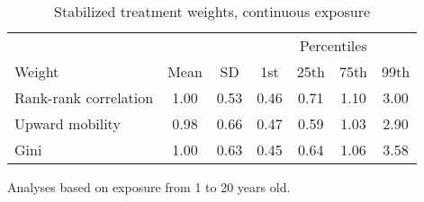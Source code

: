 \begin{table}[htp]
\centering
\footnotesize
\setlength{\tabcolsep}{10pt}
\renewcommand{\arraystretch}{1}
\begin{threeparttable}
\centering
\caption{Stabilized treatment weights, continuous exposure} 
\label{tab:psid_ipt_weigths_q}
\begin{tabular}{lcccccc}
  \hline
\multicolumn{3}{c}{} & \multicolumn{4}{c}{Percentiles} \\ 
 \cmidrule{4-7} 
Weight & Mean & SD & 1st & 25th & 75th & 99th \\ 
  \hline
Rank-rank correlation & 1.00 & 0.53 & 0.46 & 0.71 & 1.10 & 3.00 \\ 
  Upward mobility & 0.98 & 0.66 & 0.47 & 0.59 & 1.03 & 2.90 \\ 
  Gini & 1.00 & 0.63 & 0.45 & 0.64 & 1.06 & 3.58 \\ 
   \hline
\end{tabular}
\begin{tablenotes}
\footnotesize
\item Analyses based on exposure from 1 to 20 years old. 
\end{tablenotes}
\end{threeparttable}
\end{table}
